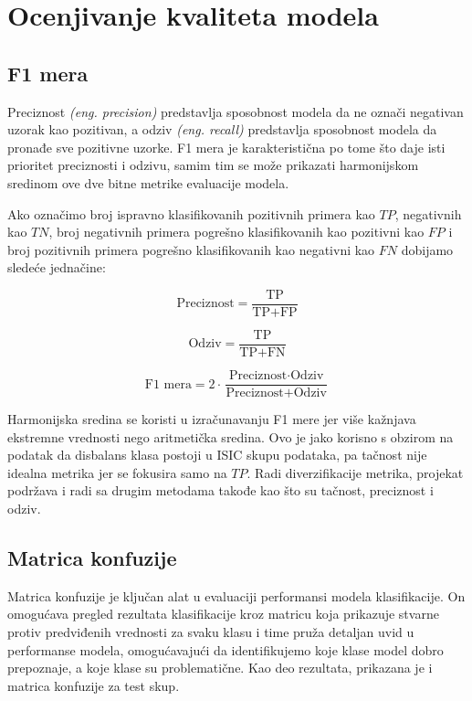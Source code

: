 \documentclass{article}
\begin{document}
\section{Ocenjivanje kvaliteta modela}
\subsection{F1 mera}

Preciznost \textit{(eng. precision)} predstavlja sposobnost modela da ne označi negativan uzorak kao pozitivan, a odziv \textit{(eng. recall)} predstavlja sposobnost modela da pronađe sve pozitivne uzorke. F1 mera je karakteristična po tome što daje isti prioritet preciznosti i odzivu, samim tim se može prikazati harmonijskom sredinom ove dve bitne metrike evaluacije modela. 
\par
Ako označimo broj ispravno klasifikovanih pozitivnih primera kao $TP$, negativnih kao $TN$, broj negativnih primera pogrešno klasifikovanih kao pozitivni kao $FP$ i broj pozitivnih primera pogrešno klasifikovanih kao negativni kao $FN$ dobijamo sledeće jednačine:

\begin{equation}
\text{Preciznost} = \frac{\text{TP}}{\text{TP} + \text{FP}}
\end{equation}

\begin{equation}
\text{Odziv} = \frac{\text{TP}}{\text{TP} + \text{FN}}
\end{equation}

\begin{equation}
\text{F1 mera} = 2 \cdot \frac{\text{Preciznost} \cdot \text{Odziv}}{\text{Preciznost} + \text{Odziv}}
\end{equation}

Harmonijska sredina se koristi u izračunavanju F1 mere jer više kažnjava ekstremne vrednosti nego aritmetička sredina. Ovo je jako korisno s obzirom na podatak da disbalans klasa postoji u ISIC skupu podataka, pa tačnost nije idealna metrika jer se fokusira samo na $TP$. Radi diverzifikacije metrika, projekat podržava i radi sa drugim metodama takođe kao što su tačnost, preciznost i odziv.

\subsection{Matrica konfuzije}

Matrica konfuzije je ključan alat u evaluaciji performansi modela klasifikacije. On omogućava pregled rezultata klasifikacije kroz matricu koja prikazuje stvarne protiv predviđenih vrednosti za svaku klasu i time pruža detaljan uvid u performanse modela, omogućavajući da identifikujemo koje klase model dobro prepoznaje, a koje klase su problematične. Kao deo rezultata, prikazana je i matrica konfuzije za test skup.
\end{document}
